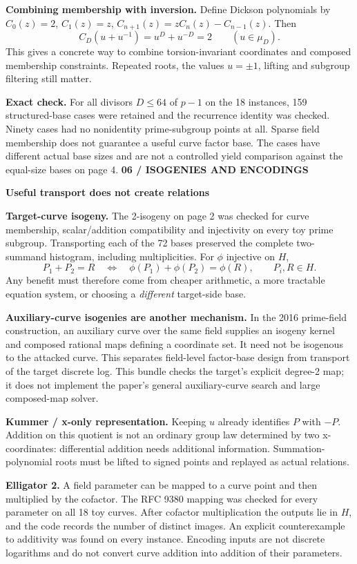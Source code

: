 \documentclass[11pt]{article}
\newcommand{\titleline}[2]{{\small\color{teal}\textbf{#1}}\par{\LARGE\color{ink}\textbf{#2}}\par\vspace{3mm}}
\begin{document}
\textbf{Combining membership with inversion.} Define Dickson polynomials by $C_0(z)=2$, $C_1(z)=z$, $C_{n+1}(z)=zC_n(z)-C_{n-1}(z)$. Then
\[
 C_D(u+u^{-1})=u^D+u^{-D}=2\qquad(u\in\mu_D).
\]
This gives a concrete way to combine torsion-invariant coordinates and composed membership constraints. Repeated roots, the values $u=\pm1$, lifting and subgroup filtering still matter.

\textbf{Exact check.} For all divisors $D\le64$ of $p-1$ on the 18 instances, 159 structured-base cases were retained and the recurrence identity was checked. Ninety cases had no nonidentity prime-subgroup points at all. Sparse field membership does not guarantee a useful curve factor base. The cases have different actual base sizes and are not a controlled yield comparison against the equal-size bases on page 4.
\newpage
\titleline{06 / ISOGENIES AND ENCODINGS}{Useful transport does not create relations}
\textbf{Target-curve isogeny.} The 2-isogeny on page 2 was checked for curve membership, scalar/addition compatibility and injectivity on every toy prime subgroup. Transporting each of the 72 bases preserved the complete two-summand histogram, including multiplicities. For $\phi$ injective on $H$,
\[
 P_1+P_2=R\quad\Longleftrightarrow\quad
 \phi(P_1)+\phi(P_2)=\phi(R),\qquad P_i,R\in H.
\]
Any benefit must therefore come from cheaper arithmetic, a more tractable equation system, or choosing a \emph{different} target-side base.

\textbf{Auxiliary-curve isogenies are another mechanism.} In the 2016 prime-field construction, an auxiliary curve over the same field supplies an isogeny kernel and composed rational maps defining a coordinate set. It need not be isogenous to the attacked curve. This separates field-level factor-base design from transport of the target discrete log. This bundle checks the target's explicit degree-2 map; it does not implement the paper's general auxiliary-curve search and large composed-map solver.

\textbf{Kummer / x-only representation.} Keeping $u$ already identifies $P$ with $-P$. Addition on this quotient is not an ordinary group law determined by two x-coordinates: differential addition needs additional information. Summation-polynomial roots must be lifted to signed points and replayed as actual relations.

\textbf{Elligator 2.} A field parameter can be mapped to a curve point and then multiplied by the cofactor. The RFC 9380 mapping was checked for every parameter on all 18 toy curves. After cofactor multiplication the outputs lie in $H$, and the code records the number of distinct images. An explicit counterexample to additivity was found on every instance. Encoding inputs are not discrete logarithms and do not convert curve addition into addition of their parameters.
\end{document}
